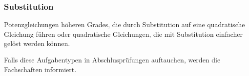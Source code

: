 







    
\subsubsection{Substitution}



Potenzgleichungen höheren Grades, die durch Substitution auf eine
quadratische Gleichung führen oder quadratische Gleichungen, die mit
Substitution einfacher gelöst werden können.

Falls diese Aufgabentypen in
Abschlusprüfungen auftauchen, werden die Fachschaften informiert.


